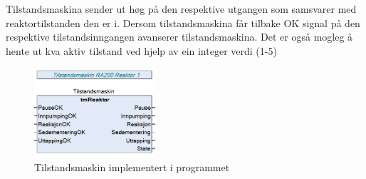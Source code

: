 Tilstandsmaskina sender ut høg på den respektive utgangen som samsvarer med reaktortilstanden den er i. Dersom tilstandsmaskina får tilbake
OK signal på den respektive tilstandsinngangen avanserer tilstandsmaskina.
Det er også mogleg å hente ut kva aktiv tilstand ved hjelp av ein integer verdi (1-5)

\begin{figure}[htbp]
    \centering
    \includegraphics[width=0.4\textwidth]{Bilder/Tilstandsmaskin.png}
    \caption{Tilstandsmaskin implementert i programmet}\label{fig:TilstandsmaskinIProgram}
\end{figure}


